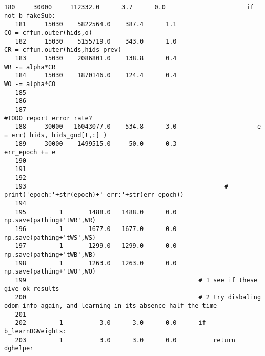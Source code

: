 \begin{lstlisting}[xrightmargin=0.05\linewidth,caption=Line by line profiling of the learnWeights\#learn function (boltzmann probs as an eager function), label=profiling:line_learn]
   180     30000     112332.0      3.7      0.0                      if not b_fakeSub:
   181     15030    5822564.0    387.4      1.1                          CO = cffun.outer(hids,o)
   182     15030    5155719.0    343.0      1.0                          CR = cffun.outer(hids,hids_prev)
   183     15030    2086801.0    138.8      0.4                          WR -= alpha*CR
   184     15030    1870146.0    124.4      0.4                          WO -= alpha*CO
   185                                           
   186                                           
   187                                                               #TODO report error rate?
   188     30000   16043077.0    534.8      3.0                      e = err( hids, hids_gnd[t,:] )
   189     30000    1499515.0     50.0      0.3                      err_epoch += e
   190                              
   191                                           
   192                                           
   193                                                      # print('epoch:'+str(epoch)+' err:'+str(err_epoch))
   194                                           
   195         1       1488.0   1488.0      0.0          np.save(pathing+'tWR',WR)
   196         1       1677.0   1677.0      0.0          np.save(pathing+'tWS',WS)
   197         1       1299.0   1299.0      0.0          np.save(pathing+'tWB',WB)
   198         1       1263.0   1263.0      0.0          np.save(pathing+'tWO',WO)
   199                                               # 1 see if these give ok results
   200                                               # 2 try disbaling odom info again, and learning in its absence half the time 
   201                                           
   202         1          3.0      3.0      0.0      if b_learnDGWeights:
   203         1          3.0      3.0      0.0          return dghelper
\end{lstlisting}
